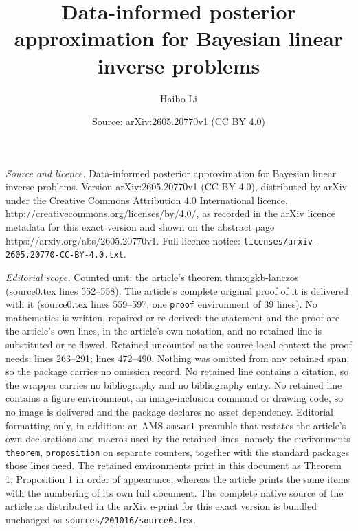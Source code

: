 \documentclass[10pt,a4paper]{amsart}
\title{Data-informed posterior approximation for Bayesian linear inverse problems}
\author{Haibo Li}
\date{Source: arXiv:2605.20770v1 (CC BY 4.0)}
\begin{document}
\maketitle

\noindent\emph{Source and licence.} Data-informed posterior approximation for Bayesian linear inverse problems. Version arXiv:2605.20770v1 (CC BY 4.0), distributed by arXiv under the Creative Commons Attribution 4.0 International licence, http://creativecommons.org/licenses/by/4.0/, as recorded in the arXiv licence metadata for this exact version and shown on the abstract page https://arxiv.org/abs/2605.20770v1. Full licence notice: \texttt{licenses/arxiv-2605.20770-CC-BY-4.0.txt}.\par\smallskip

\noindent\textit{Editorial scope.} Counted unit: the article's theorem thm:qgkb-lanczos (source0.tex lines 552--558). The article's complete original proof of it is delivered with it (source0.tex lines 559--597, one \texttt{proof} environment of 39 lines). No mathematics is written, repaired or re-derived: the statement and the proof are the article's own lines, in the article's own notation, and no retained line is substituted or re-flowed.  Retained uncounted as the source-local context the proof needs: lines 263--291; lines 472--490.  Nothing was omitted from any retained span, so the package carries no omission record.  No retained line contains a citation, so the wrapper carries no bibliography and no bibliography entry.  No retained line contains a figure environment, an image-inclusion command or drawing code, so no image is delivered and the package declares no asset dependency.  Editorial formatting only, in addition: an AMS \texttt{amsart} preamble that restates the article's own declarations and macros used by the retained lines, namely the environments \texttt{theorem}, \texttt{proposition} on separate counters, together with the standard packages those lines need.  The retained environments print in this document as Theorem 1, Proposition 1 in order of appearance, whereas the article prints the same items with the numbering of its own full document.  The complete native source of the article as distributed in the arXiv e-print for this exact version is bundled unchanged as \texttt{sources/201016/source0.tex}.
\end{document}
